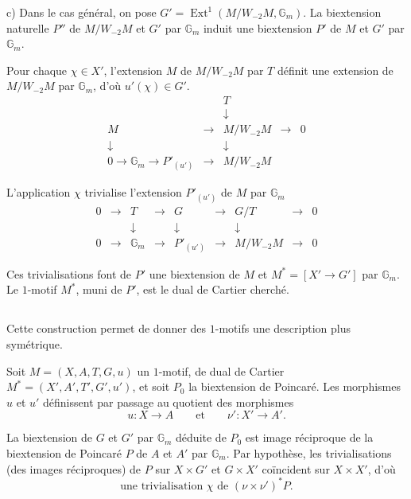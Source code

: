 \documentclass[12pt,a4paper]{amsart}
\theoremstyle{plain}
\theoremstyle{definition}
\theoremstyle{remark}
\DeclareMathOperator{\Ext}{Ext}
\numberwithin{equation}{section}
\begin{document}
c) Dans le cas général, on pose $G'=\Ext^1(M/W_{-2}M,\mathbb{G}_m)$. La biextension naturelle $P''$ de $M/W_{-2}M$ et $G'$ par $\mathbb{G}_m$ induit une biextension $P'$ de $M$ et $G'$ par $\mathbb{G}_m$.

Pour chaque $\chi\in X'$, l'extension $M$ de $M/W_{-2}M$ par $T$ définit une extension de $M/W_{-2}M$ par $\mathbb{G}_m$, d'où $u'(\chi)\in G'$.
\[
\begin{array}{ccccc}
 & & T & & \\
 & & \downarrow & & \\
M & \longrightarrow & M/W_{-2}M & \longrightarrow & 0 \\
\downarrow & & \downarrow & & \\
0 \longrightarrow \mathbb{G}_m \longrightarrow P'_{(u')} & \longrightarrow & M/W_{-2}M & &
\end{array}
\]

L'application $\chi$ trivialise l'extension $P'_{(u')}$ de $M$ par $\mathbb{G}_m$
\[
\begin{array}{ccccccccc}
0 & \longrightarrow & T & \longrightarrow & G & \longrightarrow & G/T & \longrightarrow & 0 \\
 & & \downarrow & & \downarrow & & \downarrow & & \\
0 & \longrightarrow & \mathbb{G}_m & \longrightarrow & P'_{(u')} & \longrightarrow & M/W_{-2}M & \longrightarrow & 0
\end{array}
\]

Ces trivialisations font de $P'$ une biextension de $M$ et $M^*=[X'\to G']$ par $\mathbb{G}_m$. Le $1$-motif $M^*$, muni de $P'$, est le dual de Cartier cherché.

\subsection{}\label{10.2.12}
Cette construction permet de donner des $1$-motifs une description plus symétrique.

Soit $M=(X,A,T,G,u)$ un $1$-motif, de dual de Cartier $M^*=(X',A',T',G',u')$, et soit $P_0$ la biextension de Poincaré. Les morphismes $u$ et $u'$ définissent par passage au quotient des morphismes
\begin{equation}\label{eq:10.2.12.1}
u:X\to A \qquad\text{et}\qquad \nu':X'\to A'.
\end{equation}

La biextension de $G$ et $G'$ par $\mathbb{G}_m$ déduite de $P_0$ est image réciproque de la biextension de Poincaré $P$ de $A$ et $A'$ par $\mathbb{G}_m$. Par hypothèse, les trivialisations (des images réciproques) de $P$ sur $X\times G'$ et $G\times X'$ coïncident sur $X\times X'$, d'où
\begin{equation}\label{eq:10.2.12.2}
\text{une trivialisation }\chi\text{ de }(\nu\times\nu')^*P.
\end{equation}
\end{document}
